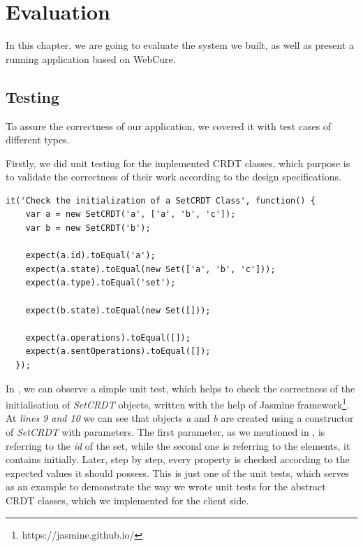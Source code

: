 \chapter{Evaluation}
\label{Evaluation}

In this chapter, we are going to evaluate the system we built, as well as present a running application based on WebCure. 

\section{Testing}

To assure the correctness of our application, we covered it with test cases of different types. 

Firstly, we did unit testing for the implemented CRDT classes, which purpose is to validate the correctness of their work according to the design specifications. 

\begin{lstlisting}[caption={[Unit test example for the \textit{SetCRDT} class]Simple unit test that checks the correct initialization of objects of a \textit{SetCRDT} class.}, label={lst:ev1}]
  it('Check the initialization of a SetCRDT Class', function() {
    var a = new SetCRDT('a', ['a', 'b', 'c']);
    var b = new SetCRDT('b');

    expect(a.id).toEqual('a');
    expect(a.state).toEqual(new Set(['a', 'b', 'c']));
    expect(a.type).toEqual('set');
    
    expect(b.state).toEqual(new Set([]));

    expect(a.operations).toEqual([]);
    expect(a.sentOperations).toEqual([]);
  });
\end{lstlisting}

In , we can observe a simple unit test, which helps to check the correctness of the initialisation of \textit{SetCRDT} objects, written with the help of Jasmine framework\footnote{https://jasmine.github.io/}. At \textit{lines 9 and 10} we can see that objects \textit{a} and \textit{b} are created using a constructor of \textit{SetCRDT} with parameters. The first parameter, as we mentioned in , is referring to the \textit{id} of the set, while the second one is referring to the elements, it contains initially. Later, step by step, every property is checked according to the expected values it should possess. This is just one of the unit tests, which serves as an example to demonstrate the way we wrote unit tests for the abstract CRDT classes, which we implemented for the client side.

